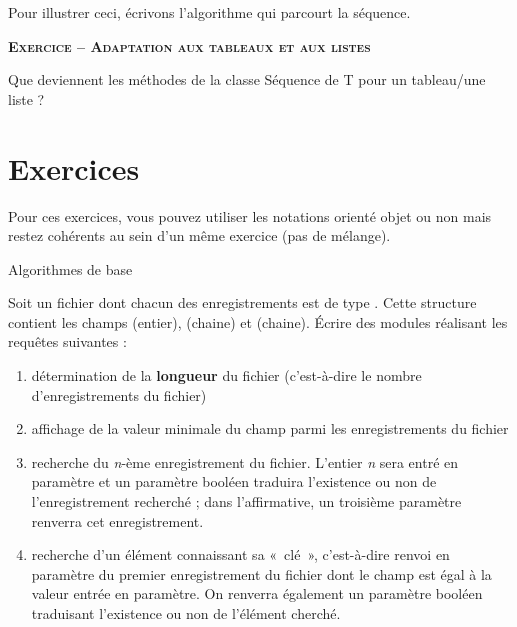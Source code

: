 
Pour illustrer ceci, écrivons l'algorithme qui parcourt
la séquence.


\bigskip

{\sffamily\bfseries\scshape
Exercice – Adaptation aux tableaux et aux listes}

Que deviennent les méthodes de la classe Séquence de T pour un
tableau/une liste ?

\section{Exercices}

Pour ces exercices, vous pouvez utiliser les notations orienté objet ou
non mais restez cohérents au sein d'un même exercice
(pas de mélange).

\begin{Exercice}{Algorithmes de base}
	
	Soit un fichier dont chacun des enregistrements est de type
	. Cette structure contient les champs
	 (entier),  (chaine)
	et  (chaine). Écrire des modules réalisant
	les requêtes suivantes :

	\begin{enumerate}[label=\alph*)]
		\item 
			détermination de la \textbf{longueur} du fichier (c’est-à-dire le nombre
			d’enregistrements du fichier)
		\item 
			affichage de la valeur minimale du champ 
			parmi les enregistrements du fichier
		\item
			recherche du \textit{n}{}-ème enregistrement du fichier. L’entier
			\textit{n} sera entré en paramètre et un paramètre booléen traduira
			l’existence ou non de l’enregistrement recherché ; dans l’affirmative,
			un troisième paramètre renverra cet enregistrement.
		\item 
			recherche d’un élément connaissant sa «~clé~», c’est-à-dire renvoi en
			paramètre du premier enregistrement du fichier dont le champ
			 est égal à la valeur 
			entrée en paramètre. On renverra également un paramètre booléen
			traduisant l’existence ou non de l’élément cherché. 
	\end{enumerate}
\end{Exercice}

